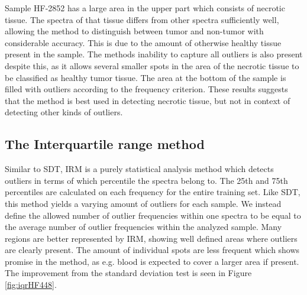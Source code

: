Sample HF-2852 has a large area in the upper part which consists of necrotic tissue. The spectra of that tissue differs from other spectra sufficiently well, allowing the method to distinguish between tumor and non-tumor with considerable accuracy. This is due to the amount of otherwise healthy tissue present in the sample. The methods inability to capture all outliers is also present despite this, as it allows several smaller spots in the area of the necrotic tissue to be classified as healthy tumor tissue. The area at the bottom of the sample is filled with outliers according to the frequency criterion. These results suggests that the method is best used in detecting necrotic tissue, but not in context of detecting other kinds of outliers.

\subsection{The Interquartile range method}

Similar to SDT, IRM is a purely statistical analysis method which detects outliers in terms of which percentile the spectra belong to. The 25th and 75th percentiles are calculated on each frequency for the entire training set. Like SDT, this method yields a varying amount of outliers for each sample. We instead define the allowed number of outlier frequencies within one spectra to be equal to the average number of outlier frequencies within the analyzed sample. Many regions are better represented by IRM, showing well defined areas where outliers are clearly present. The amount of individual spots are less frequent which shows promise in the method, as e.g. blood is expected to cover a larger area if present. The improvement from the standard deviation test is seen in Figure \ref{fig:iqrHF448}.

